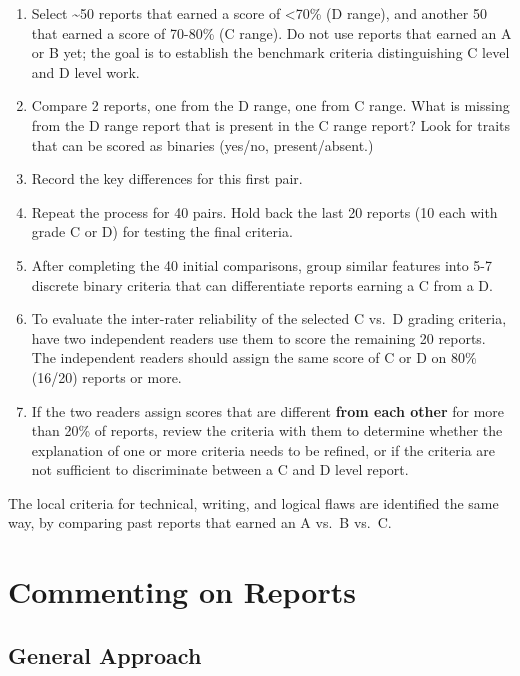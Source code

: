 \documentclass[
]{book}
\begin{document}
\begin{enumerate}
\def\labelenumi{\arabic{enumi}.}
\item
  Select \textasciitilde50 reports that earned a score of \textless70\% (D range), and another 50 that earned a score of 70-80\% (C range). Do not use reports that earned an A or B yet; the goal is to establish the benchmark criteria distinguishing C level and D level work.
\item
  Compare 2 reports, one from the D range, one from C range. What is missing from the D range report that is present in the C range report? Look for traits that can be scored as binaries (yes/no, present/absent.)
\item
  Record the key differences for this first pair.
\item
  Repeat the process for 40 pairs. Hold back the last 20 reports (10 each with grade C or D) for testing the final criteria.
\item
  After completing the 40 initial comparisons, group similar features into 5-7 discrete binary criteria that can differentiate reports earning a C from a D.
\item
  To evaluate the inter-rater reliability of the selected C vs.~D grading criteria, have two independent readers use them to score the remaining 20 reports. The independent readers should assign the same score of C or D on 80\% (16/20) reports or more.
\item
  If the two readers assign scores that are different \textbf{from each other} for more than 20\% of reports, review the criteria with them to determine whether the explanation of one or more criteria needs to be refined, or if the criteria are not sufficient to discriminate between a C and D level report.
\end{enumerate}

The local criteria for technical, writing, and logical flaws are identified the same way, by comparing past reports that earned an A vs.~B vs.~C.

\hypertarget{commenting710}{%
\chapter{Commenting on Reports}\label{commenting710}}

\hypertarget{general-approach}{%
\section{General Approach}\label{general-approach}}
\end{document}
